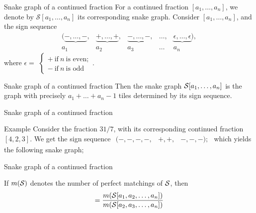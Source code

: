 \documentclass{beamer}
\def\s{\ensuremath\mathcal{S}}
\begin{document}
\begin{frame}{Snake graph of a continued fraction}
For a continued fraction $[a_1,\dots,a_n]$, we denote by $\mathcal{S}[a_1,\dots,a_n]$ its corresponding snake graph. 
\pause Consider $[a_1,\dots,a_n]$, and the sign sequence 
\begin{equation}\label{signsequence}
\begin{array}{cccccccc}
  ( \underbrace{ -,\ldots,-},&  \underbrace{ + ,\dots, +},&  \underbrace{ -,\ldots,-},& \ldots,&  \underbrace{\epsilon,\ldots,\epsilon}) ,  \\
 a_1 & a_2 & a_3&\ldots&a_n
\end{array} 
\end{equation}
where $\epsilon = $
$
\begin{cases}
+  \ \text{if} \ n \ \text{is even}; \\
- \ \text{if} \ n \ \text{is odd}
\end{cases}.
$
\end{frame}

\begin{frame}{Snake graph of a continued fraction}
\centering
    Then the snake graph $\s[a_1,\dots,a_n]$ is the graph with precisely $a_1 + \dots + a_n - 1$ tiles determined by its sign sequence.
\end{frame}
\begin{frame}{Snake graph of a continued fraction}
    \begin{exampleblock}{Example}
Consider the fraction $31/7$, with its corresponding continued fraction \pause $[4,2,3]$. We get the sign sequence \pause
$
\begin{array}{ccc}
  ( -,-,-,-,&  +,+,&  -,-,-);
\end{array}
$
which yields the following snake graph;
\pause
\begin{figure}[H]
    \centering
\end{figure}
\end{exampleblock}
\end{frame}

\begin{frame}{Snake graph of a continued fraction}
    \begin{theorem}
        If $m(\s)$ denotes the number of perfect matchings of $\s$, then \pause
        \begin{equation*}
            [a_1,a_2,\dots,a_n] = \dfrac{m(\s[a_1,a_2,\dots,a_n])}{m(\s[a_2,a_3,\dots,a_n])}
        \end{equation*}
    \end{theorem}
\end{frame}
\end{document}
